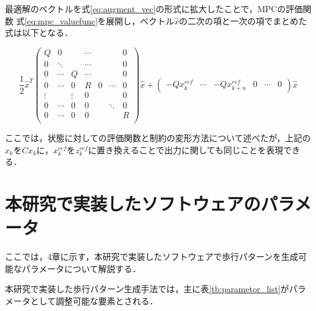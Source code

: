 最適解のベクトルを式\eqref{eq:augment_vec}の形式に拡大したことで，MPCの評価関数 式\eqref{eq:mpc_valuefunc}を展開し，ベクトル$\hat{x}$の二次の項と一次の項でまとめた式は以下となる．

\begin{equation}
  \frac{1}{2}\hat{x}^T
  \begin{pmatrix}
    Q      & 0      &        & \cdots &   &        & 0 \\
    0      & \ddots &        & \cdots &   &        & 0 \\
    0      & \cdots & Q      & \cdots &   &        & 0 \\
    0      & \cdots & 0      & R      & 0 & \cdots & 0 \\
    \vdots &        & \vdots & 0      &   &        & 0 \\
    0      & \cdots & 0      & 0      &   & \ddots & 0 \\
    0      & \cdots & 0      & 0      &   &        & R \\
  \end{pmatrix}
  \hat{x}
  +
  \begin{pmatrix}
    -Qx_{k}^{ref} & \cdots & -Qx_{k+n}^{ref} & 0 & \cdots & 0
  \end{pmatrix}
  \hat{x}
\end{equation}

ここでは，状態に対しての評価関数と制約の変形方法について述べたが，上記の$x_{k}$を$Cx_{k}$に，$x_{k}^{ref}$を$z_{k}^{ref}$に置き換えることで出力に関しても同じことを表現できる．

\section{本研究で実装したソフトウェアのパラメータ}

ここでは，4章に示す，本研究で実装したソフトウェアで歩行パターンを生成可能なパラメータについて解説する．

本研究で実装した歩行パターン生成手法では，主に表\ref{tb:parametor_list}がパラメータとして調整可能な要素とされる．

